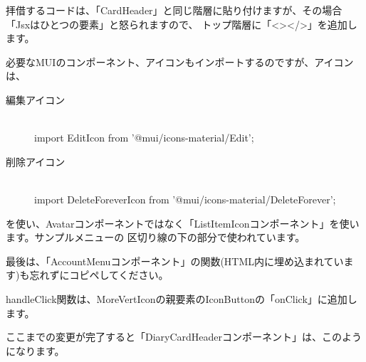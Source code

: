 \clearpage


拝借するコードは、「CardHeader」と同じ階層に貼り付けますが、その場合「Jsxはひとつの要素」と怒られますので、
トップ階層に「\textless{}\textgreater{}\textless{}/\textgreater{}」を追加します。

\vspace*{\baselineskip}

必要なMUIのコンポーネント、アイコンもインポートするのですが、アイコンは、

\begin{description}
\item[編集アイコン] \mbox{} \\
import EditIcon from '@mui/icons{-}material/Edit';
\item[削除アイコン] \mbox{} \\
import DeleteForeverIcon from '@mui/icons{-}material/DeleteForever';
\end{description}

を使い、Avatarコンポーネントではなく「ListItemIconコンポーネント」を使います。サンプルメニューの
区切り線の下の部分で使われています。

\vspace*{\baselineskip}

最後は、「AccountMenuコンポーネント」の関数(HTML内に埋め込まれています)も忘れずにコピペしてください。

\vspace*{\baselineskip}

handleClick関数は、MoreVertIconの親要素のIconButtonの「onClick」に追加します。

ここまでの変更が完了すると「DiaryCardHeaderコンポーネント」は、このようになります。

